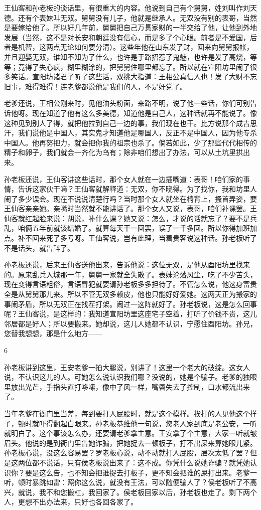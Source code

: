 王仙客和孙老板的谈话里，有很重大的内容。他说到自己有个舅舅，姓刘叫作刘天德。还有个表妹叫无双。舅舅没有儿子，他就是继承人。无双没有别的表哥，当然是要嫁给他了。所以好几年前，舅舅把自己万贯家财的一半交给了他，让他到外地发展（当然，这不是对长安和朝廷没有信心，而是多了个心眼。前者是不爱国，后者是机智，这两点无论如何要分清）。这些年他在山东发了财，回来向舅舅报帐，并且迎娶无双，谁知不知为了什么，也许是于路招惹了鬼魅，也许是发了高烧，等等；竟得了失心疯，糊里糊涂的，把舅舅住哪里都忘了。所以就在宣阳坊里闹了很多笑话。宣阳坊诸君子听了这些话，双挑大指道：王相公真信人也！发了大财不忘旧事，难得难得！连老爹都说他是我们的人，不是奸党了。 

老爹还说，王相公刚来时，见他油头粉面，来路不明，说了他一些话，你们可别告诉他呀。现在知道了他有这么多美德，知道他是自己人，这种话就再不能说了。像这种见到别人了得，就把他拉到自己一边的事，我们现在也干。比方说那个成吉思汗，我们说他是中国人，其实鬼才知道他是哪国人，反正不是中国人，因为他专杀中国人。他再努把力，就会把你我的祖宗也杀了。倘若如此，少了那些代代相传的精子和卵子，我们就会一齐化为乌有；除非咱们想出了办法，可以从土坑里拱出来。 

孙老板还说，王仙客讲这些话时，那个女人就在一边插嘴道：表哥！咱们家的事情，告诉这家伙干嘛？王仙客就解释道：无双，你不晓得。为了找你，我和坊里人闹了多少误会。现在不说说清楚行吗？当时那个女人就坐在椅背上，搔首弄姿，要王仙客亲亲她。亲嘴时当然就不能讲话了。那个女人又说，表哥，咱们补课罢。王仙客就红起脸来说：胡说，补什么课？她又说：怎么，才说的话就忘了？要不是兵乱，咱俩五年前就该结婚了。就算每天干一回罢，误了一千多回。所以你得加班加点。补不回来死了多亏呀。王仙客说，岂有此理，当着贵客说这种话。孙老板听了不是话头，就告辞了。 

孙老板还说，后来王仙客送他出来，告诉他说：这位无双，是他从酉阳坊里找来的。原来乱兵入城那一年，舅舅一家就全失散了。表妹沦落风尘，吃了不少苦头，现在变得言语粗俗，言语冒犯就要请孙老板多多担待了。不管怎么说，他这身富贵全是从舅舅那儿来。所以不管无双多赖皮，他也只能好好爱她。这两天正为搬家的事闹矛盾，所以无双正在找茬打架。闹过一这阵就好了。孙老板说，这是怎么回事呢？王仙客说，是这样的：我知道宣阳坊里这座宅子空着，打听了价钱不贵，这儿邻居都是好人；所以要搬来。她却说，这儿人她都不认识，宁愿住酉阳坊。孙兄，您替我想想，那是什么地方—— 

6 

孙老板讲到这里，王安老爹一拍大腿说，别讲了！这里一个老大的破绽。这女人说，不认识这儿的人。可她怎么说认识我们哪？没说的，她是个骗子。老爹的独眼里放出光芒，手指头直打哆嗦，像中了风一样，嘴唇失去了控制，口水都流出来了。 

当年老爹在衙门里当差，每到要打人屁股时，就是这个模样。挨打的人见他这个样子，顿时就吓得翻起白眼来。孙老板恭维他一句说，您老人家到底是老公安，一听就明白了。这个事该怎么办，还要请老爹拿主意。王安拿了个主意，大家一听就皱眉头。他说的是到衙门里告她诈骗，把她捉去一顿板子，打不出屎来算她眼儿紧。孙老板心说，没这么容易罢？罗老板心说，动不动就打人屁股，层次太低了罢？但是这两位都不说话，只有侯老板说出来了：这不成。你凭什么说她诈骗？就凭她认识你？要是这么告，也不知会把谁捉去打板子，更不知会把谁的屎打出来。老爹一听，顿时暴跳如雷：照你这么说，就没有王法，可以随便骗人了？侯老板听了不高兴，就说，我不和您搬杠，我回家了。侯老板回家以后，孙老板也走了。剩下两个人，更想不出办法来，只好也各回各家了。 

